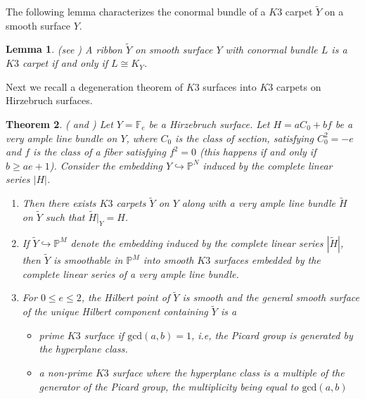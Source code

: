 \documentclass[11pt,twoside]{amsart}
\theoremstyle{plain}
\numberwithin{equation}{section}
\newtheorem{theorem}{Theorem}[section]
\newtheorem{lemma}[theorem]{Lemma}
\theoremstyle{definition}
\begin{document}
The following lemma characterizes the conormal bundle of a $K3$ carpet $\widetilde{Y}$ on a smooth surface $Y$.

\begin{lemma}(see \cite[Proposition $2.1$]{GGP08})
    A ribbon $\widetilde{Y}$ on smooth surface $Y$ with conormal bundle $L$ is a $K3$ carpet if and only if $L \cong K_Y$.
\end{lemma}

Next we recall a degeneration theorem of $K3$ surfaces into $K3$ carpets on Hirzebruch surfaces.

\begin{theorem}\label{degeneration into $K3$ carpets}(\cite[Theorem $4.1$]{BMR21} and \cite[Theorem $2.9$]{GP97})
Let $Y = \mathbb{F}_e$ be a Hirzebruch surface. Let $H = aC_0+bf$ be a very ample line bundle on $Y$, where $C_0$ is the class of section, satisfying $C_0^2 = -e$ and $f$ is the class of a fiber satisfying $f^2 = 0$ (this happens if and only if $b \geq ae+1$). Consider the embedding $Y \hookrightarrow \mathbb{P}^N$ induced by the complete linear series $|H|$.  
\begin{enumerate}
    \item Then there exists $K3$ carpets $\widetilde{Y}$ on $Y$ along with a very ample line bundle $\widetilde{H}$ on $\widetilde{Y}$ such that $\widetilde{H}|_Y = H$.

    \item If $\widetilde{Y} \hookrightarrow \mathbb{P}^M$ denote the embedding induced by the complete linear series $|\widetilde{H}|$, then $\widetilde{Y}$ is smoothable in $\mathbb{P}^M$ into smooth $K3$ surfaces embedded by the complete linear series of a very ample line bundle.

    \item For $0 \leq e \leq 2$, the Hilbert point of $\widetilde{Y}$ is smooth and the general smooth surface of the unique Hilbert component containing $\widetilde{Y}$ is a 
    \begin{itemize}
        \item[(a)] prime $K3$ surface if $\textrm{gcd}(a,b) = 1$, i.e, the Picard group is generated by the hyperplane class.
        \item[(b)] a non-prime $K3$ surface where the hyperplane class is a multiple of the generator of the Picard group, the multiplicity being equal to $\textrm{gcd}(a,b)$
    \end{itemize}
\end{enumerate}
\end{theorem}
\end{document}
